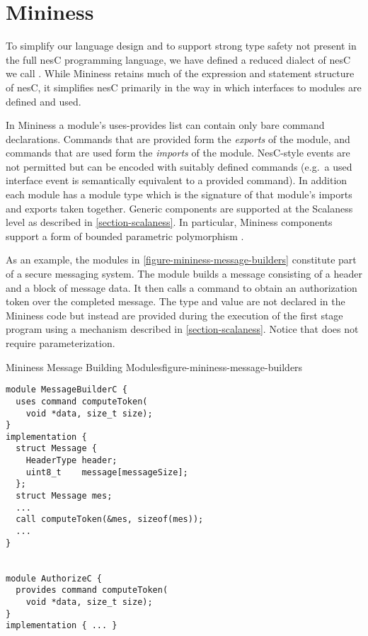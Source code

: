 
\section{Mininess}
\label{section-mininess}

To simplify our language design and to support strong type safety not
present in the full nesC programming language, we have defined a
reduced dialect of nesC we call . While Mininess
retains much of the expression and statement structure of nesC, it
simplifies nesC primarily in the way in which interfaces to modules
are defined and used.

In Mininess a module's uses-provides list can contain only bare
command declarations. Commands that are provided form the
\textit{exports} of the module, and commands that are used form the
\textit{imports} of the module. NesC-style events are not permitted
but can be encoded with suitably defined commands (e.g.~a used
interface event is semantically equivalent to a provided command). In
addition each module has a module type which is the signature of that
module's imports and exports taken together. Generic components are
supported at the Scalaness level as described in
\autoref{section-scalaness}. In particular, Mininess components
support a form of bounded parametric polymorphism \cite{FramedML}.

As an example, the modules in
\autoref{figure-mininess-message-builders} constitute part of a secure
messaging system. The  module builds a message
consisting of a header and a block of message data. It then calls a
 command to obtain an authorization token over the
completed message. The type  and value
 are not declared in the Mininess code but instead
are provided during the execution of the first stage program using a
mechanism described in \autoref{section-scalaness}. Notice that
 does not require parameterization.

\begin{fpfig}[tbhp]{Mininess Message Building Modules}{figure-mininess-message-builders}
{
\begin{Verbatim}[fontsize=\small]
module MessageBuilderC {
  uses command computeToken(
    void *data, size_t size);
}
implementation {
  struct Message {
    HeaderType header;
    uint8_t    message[messageSize];
  };
  struct Message mes;
  ...
  call computeToken(&mes, sizeof(mes));
  ...
}


module AuthorizeC {
  provides command computeToken(
    void *data, size_t size);
}
implementation { ... }
\end{Verbatim}
}
\end{fpfig}

